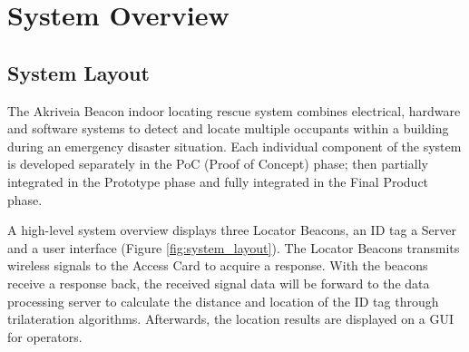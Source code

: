 %

\setcounter{section}{1}
\section{System Overview}
\bigskip
\subsection{System Layout}
\bigskip
The Akriveia Beacon indoor locating rescue system combines electrical, hardware and software systems to detect and locate multiple occupants within a building during an emergency disaster situation. Each individual component of the system is developed separately in the PoC (Proof of Concept) phase; then partially integrated in the Prototype phase and fully integrated in the Final Product phase.   

\bigskip
A high-level system overview displays  three Locator Beacons, an ID tag a Server and a user interface (Figure \ref{fig:system_layout}). The Locator Beacons transmits wireless signals to the Access Card to acquire a response. With the beacons receive a response back, the received signal data will be forward to the data processing server to calculate the distance and location of the ID tag through trilateration algorithms. Afterwards, the location results are displayed on a \Gls{GUI} for operators.


